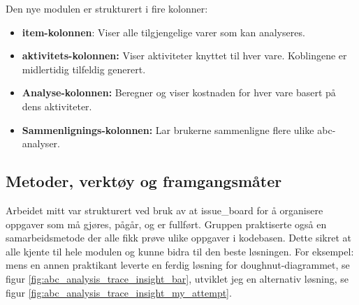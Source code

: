 Den nye modulen er strukturert i fire kolonner:
\begin{itemize}
    \item \textbf{\Gls{item}-kolonnen}: Viser alle tilgjengelige varer som kan analyseres.
    \item \textbf{\Gls{aktivitet}s-kolonnen:} Viser aktiviteter knyttet til hver vare. Koblingene er midlertidig tilfeldig generert.
    \item \textbf{Analyse-kolonnen:} Beregner og viser kostnaden for hver vare basert på dens aktiviteter.
    \item \textbf{Sammenlignings-kolonnen:} Lar brukerne sammenligne flere ulike \gls{abc}-analyser.
\end{itemize}

\subsection{Metoder, verktøy og framgangsmåter}



Arbeidet mitt var strukturert ved bruk av at \gls{issue_board} for å organisere oppgaver som må gjøres, pågår, og er fullført. Gruppen praktiserte også en samarbeidsmetode der alle fikk prøve ulike oppgaver i kodebasen. Dette sikret at alle kjente til hele modulen og kunne bidra til den beste løsningen. For eksempel: mens en annen praktikant leverte en ferdig løsning for doughnut-diagrammet, se figur \ref{fig:abc_analysis_trace_insight_bar}, utviklet jeg en alternativ løsning, se figur \ref{fig:abc_analysis_trace_insight_my_attempt}. 

